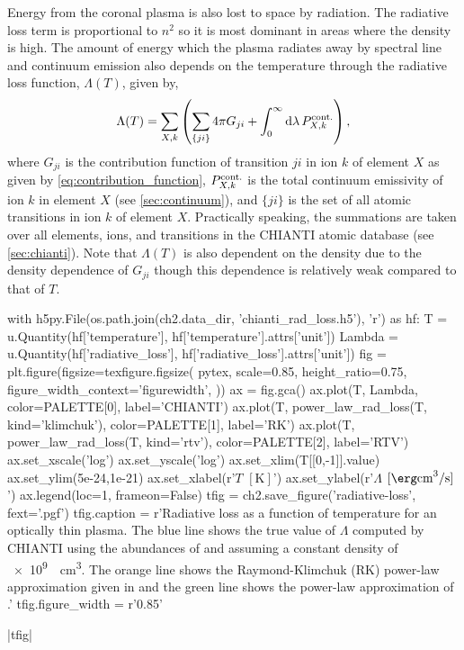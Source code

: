 Energy from the coronal plasma is also lost to space by radiation. The radiative loss term is proportional to $n^2$ so it is most dominant in areas where the density is high. The amount of energy which the plasma radiates away by spectral line and continuum emission also depends on the temperature through the radiative loss function, $\Lambda(T)$, given by,
\begin{equation}\label{eq:rad-loss}
    \Lambda(T) = \sum_{X,k}\left(\sum_{\{ji\}}4\pi G_{ji}  + \int_0^\infty\textup{d}\lambda\,P_{X,k}^\textup{cont.} \right),
\end{equation}
where $G_{ji}$ is the contribution function of transition $ji$ in ion $k$ of element $X$ as given by \autoref{eq:contribution_function}, $P_{X,k}^\textup{cont.}$ is the total continuum emissivity of ion $k$ in element $X$ (see \autoref{sec:continuum}), and $\{ji\}$ is the set of all atomic transitions in ion $k$ of element $X$. Practically speaking, the summations are taken over all elements, ions, and transitions in the CHIANTI atomic database (see \autoref{sec:chianti}). Note that $\Lambda(T)$ is also dependent on the density due to the density dependence of $G_{ji}$ though this dependence is relatively weak compared to that of $T$.

\begin{pycode}[chapter2]
with h5py.File(os.path.join(ch2.data_dir, 'chianti_rad_loss.h5'), 'r') as hf:
    T = u.Quantity(hf['temperature'], hf['temperature'].attrs['unit'])
    Lambda = u.Quantity(hf['radiative_loss'], hf['radiative_loss'].attrs['unit'])
fig = plt.figure(figsize=texfigure.figsize(
    pytex,
    scale=0.85,
    height_ratio=0.75,
    figure_width_context='figurewidth',
))
ax = fig.gca()
ax.plot(T, Lambda, color=PALETTE[0], label='CHIANTI')
ax.plot(T, power_law_rad_loss(T, kind='klimchuk'), color=PALETTE[1], label='RK')
ax.plot(T, power_law_rad_loss(T, kind='rtv'), color=PALETTE[2], label='RTV')
ax.set_xscale('log')
ax.set_yscale('log')
ax.set_xlim(T[[0,-1]].value)
ax.set_ylim(5e-24,1e-21)
ax.set_xlabel(r'$T$ $[\si{\kelvin}]$')
ax.set_ylabel(r'$\Lambda$ $[\si{\erg\cubic\cm\per\second}]$')
ax.legend(loc=1, frameon=False)
tfig = ch2.save_figure('radiative-loss', fext='.pgf')
tfig.caption = r'Radiative loss as a function of temperature for an optically thin plasma. The blue line shows the true value of $\Lambda$ computed by CHIANTI using the abundances of \citet{feldman_potential_1992} and assuming a constant density of \SI{e9}{\per\cubic\cm}. The orange line shows the Raymond-Klimchuk (RK) power-law approximation given in \citet{klimchuk_highly_2008} and the green line shows the power-law approximation of \citet[RTV]{rosner_dynamics_1978}.'
tfig.figure_width = r'0.85\textwidth'
\end{pycode}
\py[chapter2]|tfig|

